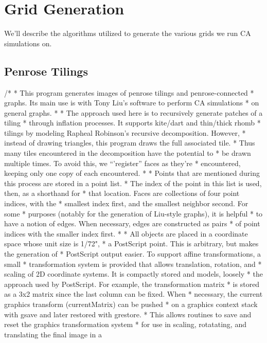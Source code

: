 \documentclass[a4paper,11pt]{report}
\begin{document}
\section{Grid Generation}
\label{sec:GridGen}

We'll describe the algorithms utilized to generate the various grids we run CA simulations on.

\subsection{Penrose Tilings}

/*
 * This program generates images of penrose tilings and penrose-connected
 * graphs.  Its main use is with Tony Liu's software to perform CA simulations
 * on general graphs.
 *
 * The approach used here is to recursively generate patches of a tiling
 * through inflation processes.  It supports kite/dart and thin/thick rhomb
 * tilings by modeling Rapheal Robinson's recursive decomposition.  However,
 * instead of drawing triangles, this program draws the full associated tile.
 * Thus many tiles encountered in the decomposition have the potential to
 * be drawn multiple times.  To avoid this, we ``'register'' faces as they're
 * encountered, keeping only one copy of each encountered.
 *
 * Points that are mentioned during this process are stored in a point list.
 * The index of the point in this list is used, then, as a shorthand for
 * that location.  Faces are collections of four point indices, with the
 * smallest index first, and the smallest neighbor second.  For some
 * purposes (notably for the generation of Liu-style graphs), it is helpful
 * to have a notion of edges.  When necessary, edges are constructed as pairs
 * of point indices with the smaller index first.
 *
 * All objects are placed in a coordinate space whose unit size is 1/72",
 * a PostScript point.  This is arbitrary, but makes the generation of
 * PostScript output easier.  To support affine transformations, a small
 * transformation system is provided that allows translation, rotation, and
 * scaling of 2D coordinate systems.  It is compactly stored and models, loosely
 * the approach used by PostScript.  For example, the transformation matrix
 * is stored as a 3x2 matrix since the last column can be fixed.  When
 * necessary, the current graphics transform (currentMatrix) can be pushed
 * on a graphics context stack with gsave and later restored with grestore.
 * This allows routines to save and reset the graphics transformation system
 * for use in scaling, rotatating, and translating the final image in a
\end{document}
